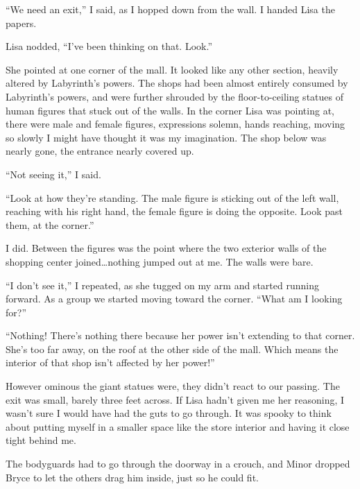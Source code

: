 ``We need an exit,'' I said, as I hopped down from the wall.  I handed Lisa the papers.



Lisa nodded, ``I've been thinking on that.  Look.''



She pointed at one corner of the mall.  It looked like any other section, heavily altered by Labyrinth's powers.  The shops had been almost entirely consumed by Labyrinth's powers, and were further shrouded by the floor-to-ceiling statues of human figures that stuck out of the walls.  In the corner Lisa was pointing at, there were male and female figures, expressions solemn, hands reaching, moving so slowly I might have thought it was my imagination.  The shop below was nearly gone, the entrance nearly covered up.



``Not seeing it,'' I said.



``Look at how they're standing.  The male figure is sticking out of the left wall, reaching with his right hand, the female figure is doing the opposite.  Look past them, at the corner.''



I did.  Between the figures was the point where the two exterior walls of the shopping center joined\ldots nothing jumped out at me.  The walls were bare.



``I don't see it,'' I repeated, as she tugged on my arm and started running forward.  As a group we started moving toward the corner.  ``What am I looking for?''



``Nothing!  There's nothing there because her power isn't extending to that corner.  She's too far away, on the roof at the other side of the mall. Which means the interior of that shop isn't affected by her power!''



However ominous the giant statues were, they didn't react to our passing.  The exit was small, barely three feet across.  If Lisa hadn't given me her reasoning, I wasn't sure I would have had the guts to go through.  It was spooky to think about putting myself in a smaller space like the store interior and having it close tight behind me.



The bodyguards had to go through the doorway in a crouch, and Minor dropped Bryce to let the others drag him inside, just so he could fit.




